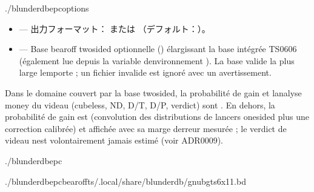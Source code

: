 \documentclass[letterpaper,10pt,dvipdfmx]{sphinxmanual}
\begin{document}
\begin{sphinxVerbatim}[commandchars=\\\{\}]
./blunderdbepc\PYG{o}{[}options\PYG{o}{]}
\end{sphinxVerbatim}

\sphinxAtStartPar
{}
\begin{itemize}
\item {} 
\sphinxAtStartPar
{} — 出力フォーマット： または （デフォルト：）。

\item {} 
\sphinxAtStartPar
{} — Base bearoff two\sphinxhyphen{}sided optionnelle () élargissant
la base intégrée TS\sphinxhyphen{}06\sphinxhyphen{}06 (également lue depuis la variable d\textquotesingle{}environnement
). La base valide la plus large l\textquotesingle{}emporte ; un fichier
invalide est ignoré avec un avertissement.

\end{itemize}

\sphinxAtStartPar
{} Dans le domaine couvert par la base two\sphinxhyphen{}sided, la probabilité de
gain et l\textquotesingle{}analyse money du videau (cubeless, ND, D/T, D/P, verdict) sont
. En dehors, la probabilité de gain est  (convolution
des distributions de lancers one\sphinxhyphen{}sided plus une correction calibrée) et
affichée avec sa marge d\textquotesingle{}erreur mesurée ; le verdict de videau n\textquotesingle{}est
volontairement jamais estimé (voir ADR\sphinxhyphen{}0009).

\sphinxAtStartPar
{}

\begin{sphinxVerbatim}[commandchars=\\\{\}]
./blunderdbepc

./blunderdbepc\PYGZhy{}\PYGZhy{}bearoff\PYGZhy{}ts\PYGZti{}/.local/share/blunderdb/gnubg\PYGZus{}ts6x11.bd
\end{sphinxVerbatim}
\end{document}
